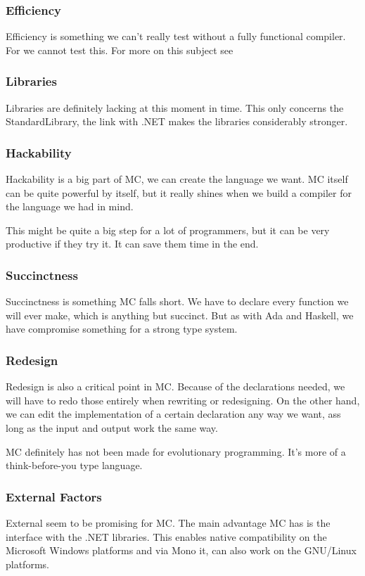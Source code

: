 \begin{multicols}{2}
   \subsubsection{Efficiency}
   Efficiency is something we can't really test without a fully functional compiler.
   For we cannot test this.
   For more on this subject see \cite{jarnoshizzle}

   \subsubsection{Libraries}
   Libraries are definitely lacking at this moment in time.
   This only concerns the StandardLibrary, the link with .NET makes the libraries considerably stronger.

   \subsubsection{Hackability}
   Hackability is a big part of MC, we can create the language we want.
   MC itself can be quite powerful by itself, but it really shines when we build a compiler for the language we had in mind.

   This might be quite a big step for a lot of programmers, but it can be very productive if they try it.
   It can save them time in the end.

   \subsubsection{Succinctness}
   Succinctness is something MC falls short.
   We have to declare every function we will ever make, which is anything but succinct.
   But as with Ada and Haskell, we have compromise something for a strong type system.

   \subsubsection{Redesign}
   Redesign is also a critical point in MC.
   Because of the declarations needed, we will have to redo those entirely when rewriting or redesigning.
   On the other hand, we can edit the implementation of a certain declaration any way we want, ass long as the input and output work the same way.

   MC definitely has not been made for evolutionary programming.
   It's more of a think-before-you type language.

   \subsubsection{External Factors}
   External  seem to be promising for MC.
   The main advantage MC has is the interface with the .NET libraries.
   This enables native compatibility on the Microsoft Windows platforms and via Mono it, can also work on the GNU/Linux platforms.

\end{multicols}
